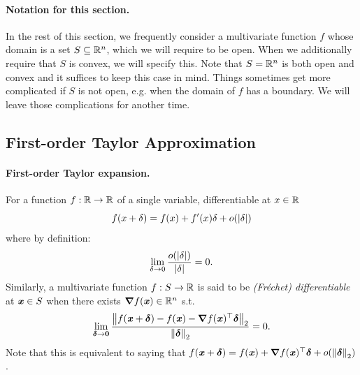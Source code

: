 \paragraph{Notation for this section.}
  In the rest of this section, we frequently consider a multivariate function $f$
  whose domain is a set $S \subseteq \mathbb{R}^n$, which we will require to
  be open.
  When we additionally require that $S$ is convex, we will specify this.
  Note that $S = \mathbb{R}^n$ is both open and convex and it suffices to keep
  this case in mind.
  Things sometimes get more complicated if $S$ is not open, e.g. when the
  domain of $f$ has a boundary.
  We will leave those complications for another time.

\subsection{First-order Taylor Approximation}

%
\paragraph{First-order Taylor expansion.}
For a function $f:\mathbb{R}\rightarrow\mathbb{R}$ of a single variable,
differentiable at $x \in \mathbb{R}$
\begin{displaymath}
    f(x+\delta) = f(x) + f'(x) \delta + o(\left|\delta \right|)
\end{displaymath}
where by definition:
\begin{displaymath}
    \lim_{\delta\rightarrow 0} \frac{o(\left|\delta \right|)}{\left|\delta \right|} = 0
    .
  \end{displaymath}
  Similarly, a multivariate function $f:S \rightarrow \mathbb{R}$
  is said to
be
\emph{(Fr\'{e}chet) differentiable} at $\boldsymbol{\mathit{x}} \in S$ when there exists
$\boldsymbol{\nabla} f(\boldsymbol{\mathit{x}}) \in \mathbb{R}^n$ s.t.
\begin{displaymath}
  \lim_{\boldsymbol{\delta} \to \boldsymbol{0}}
  \frac{\left\| f(\boldsymbol{\mathit{x}}+\boldsymbol{\delta}) - f(\boldsymbol{\mathit{x}}) -\boldsymbol{\nabla} f(\boldsymbol{\mathit{x}})^{\top} \boldsymbol{\delta}   \right\|_2}{
    \left\| \boldsymbol{\delta} \right\|_2
  } = 0
    .
\end{displaymath}
Note that this is equivalent to saying that
$f(\boldsymbol{\mathit{x}}+\boldsymbol{\delta}) = f(\boldsymbol{\mathit{x}}) + \boldsymbol{\nabla} f(\boldsymbol{\mathit{x}})^\top\boldsymbol{\delta} +
o(\left\| \boldsymbol{\delta} \right\|_2)$.

